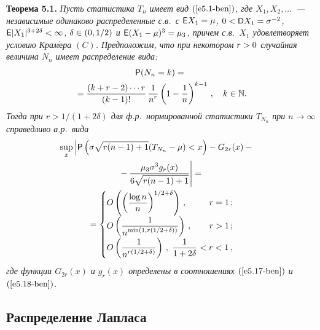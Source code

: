 \begin{multicols}{2}
\smallskip

\noindent
\textbf{Теорема 5.1.} \textit{Пусть статистика $T_n$ имеет вид $(\ref{e5.1-ben})$,
где  $X_1,X_2,\ldots$~--- независимые одинаково распределенные с.в.\ с
${\sf E}X_1 \hm= \mu$, $0\hm<{\sf D}X_1 \hm=\sigma^{-2}$, $\e
|X_1|^{3+2\delta} \hm< \infty$, $\delta\hm\in(0,1/2)$ и ${\sf E}(X_1 -
\mu)^3 \hm= \mu_3$, причем с.в.\ $X_1$ удовлетворяет условию
Крам$\acute{\mbox{е}}$ра $(C)$. Предположим, что при некотором $r\hm>0$
случайная величина $N_n$ имеет распределение вида:
\begin{multline*}
{{\sf P}}(N_n = k) = {}\\
{}=\displaystyle\frac{\displaystyle (k+r-2)\cdots r\mathstrut}{\displaystyle (k-1)!\mathstrut} \,\displaystyle\frac{\displaystyle 1\mathstrut}{\displaystyle n^r\mathstrut} \left(1
- \displaystyle\frac{\displaystyle 1\mathstrut}{\displaystyle n\mathstrut}\right)^{k-1}\,, \quad   k\in\mathbb N.
\end{multline*}
Тогда при $r > 1/(1+2\delta)$ для ф.р.\ нормированной статистики
$T_{N_n}$ при $n\to\infty$ справедливо а.р.\ вида
\begin{multline*}
\hspace*{-7.7pt}\sup\limits_x \left|{\p}\left(\sigma\sqrt {r(n-1)+1} (T_{N_n} - \mu) <
x\right) - G_{2r}(x) -{}\right.\\
\left.{}- \fr{\mu_3\sigma^3g_r(x)}{6\sqrt{r(n-1)+1}}
\right| ={}
\\
{}= \begin{cases} 
{O}\left(\left(\fr{\log
n}{n}\right)^{1/2+\delta}\right)\,, & \quad \hspace*{2pt} r = 1\,;\\[4pt]
{O}\left(\fr{1}{n^{\min(1, r(1/2+\delta))}}\right)\,,
&\quad \hspace*{2pt}  r > 1\,;\\[4pt]
{O}\left(\fr{1}{n^{r(1/2+\delta)}}\right)\,, &
\hspace*{-11mm}\fr{1}{1+2\delta} < r < 1\,,
\end{cases}
\end{multline*}
где функции $G_{2r}(x)$ и $g_r(x)$ определены в соотношениях
$(\ref{e5.17-ben})$ и $(\ref{e5.18-ben})$.}

\subsection{Распределение Лапласа}


\end{multicols}
